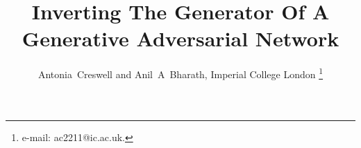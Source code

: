 \documentclass[journal]{IEEEtran}
\begin{document}
%
\title{Inverting The Generator Of A Generative Adversarial Network}



\author{Antonia~Creswell and Anil~A~Bharath, Imperial College London
\thanks{e-mail: ac2211@ic.ac.uk.}}



% 
\end{document}
